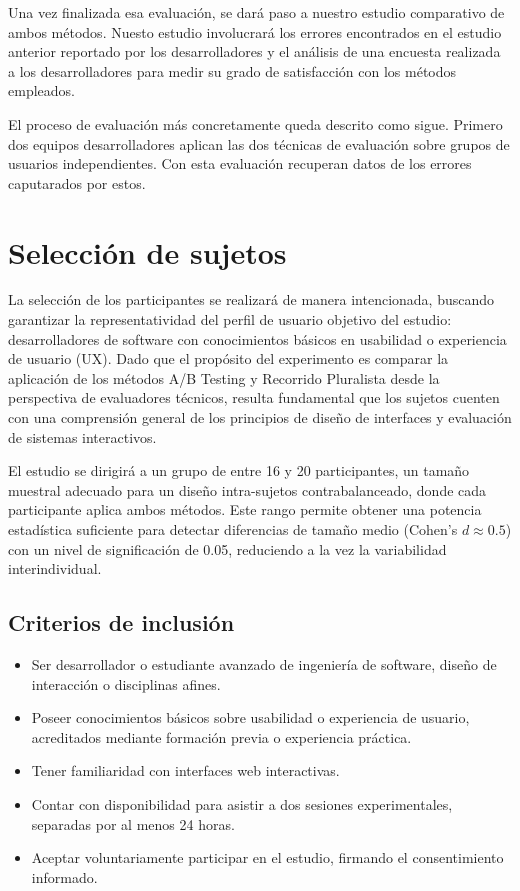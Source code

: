 \documentclass[a4paper,12pt]{report}
\begin{document}
Una vez finalizada esa evaluación, se dará paso a nuestro estudio comparativo de ambos métodos. Nuesto estudio involucrará los errores encontrados en el estudio anterior reportado por los desarrolladores y el análisis de una encuesta realizada a los desarrolladores para medir su grado de satisfacción con los métodos empleados.

El proceso de evaluación más concretamente queda descrito como sigue. Primero dos equipos desarrolladores aplican las dos técnicas de evaluación sobre grupos de usuarios independientes. Con esta evaluación recuperan datos de los errores caputarados por estos. 


\section{Selección de sujetos}

La selección de los participantes se realizará de manera intencionada, buscando garantizar la representatividad del perfil de usuario objetivo del estudio: desarrolladores de software con conocimientos básicos en usabilidad o experiencia de usuario (UX). Dado que el propósito del experimento es comparar la aplicación de los métodos A/B Testing y Recorrido Pluralista desde la perspectiva de evaluadores técnicos, resulta fundamental que los sujetos cuenten con una comprensión general de los principios de diseño de interfaces y evaluación de sistemas interactivos.

El estudio se dirigirá a un grupo de entre 16 y 20 participantes, un tamaño muestral adecuado para un diseño intra-sujetos contrabalanceado, donde cada participante aplica ambos métodos. Este rango permite obtener una potencia estadística suficiente para detectar diferencias de tamaño medio (Cohen's $d \approx 0.5$) con un nivel de significación de 0.05, reduciendo a la vez la variabilidad interindividual.

\subsection*{Criterios de inclusión}
\begin{itemize}
    \item Ser desarrollador o estudiante avanzado de ingeniería de software, diseño de interacción o disciplinas afines.
    \item Poseer conocimientos básicos sobre usabilidad o experiencia de usuario, acreditados mediante formación previa o experiencia práctica.
    \item Tener familiaridad con interfaces web interactivas.
    \item Contar con disponibilidad para asistir a dos sesiones experimentales, separadas por al menos 24 horas.
    \item Aceptar voluntariamente participar en el estudio, firmando el consentimiento informado.
\end{itemize}
\end{document}
